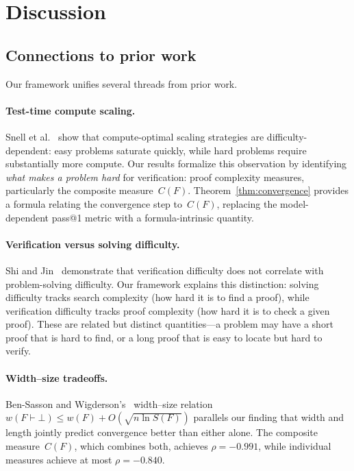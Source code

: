 \section{Discussion}\label{sec:discussion}

\subsection{Connections to prior work}\label{sec:connections}

Our framework unifies several threads from prior work.

\paragraph{Test-time compute scaling.}
Snell et al.~\cite{snell2024scaling} show that compute-optimal scaling
strategies are difficulty-dependent: easy problems saturate quickly, while hard
problems require substantially more compute.  Our results formalize this
observation by identifying \emph{what makes a problem hard} for verification:
proof complexity measures, particularly the composite measure~$C(F)$.
Theorem~\ref{thm:convergence} provides a formula relating the convergence step
to~$C(F)$, replacing the model-dependent pass@1 metric with a formula-intrinsic
quantity.

\paragraph{Verification versus solving difficulty.}
Shi and Jin~\cite{shi2025heimdall} demonstrate that verification difficulty
does not correlate with problem-solving difficulty.  Our framework explains this
distinction: solving difficulty tracks search complexity (how hard it is to find
a proof), while verification difficulty tracks proof complexity (how hard it is
to check a given proof).  These are related but distinct quantities---a problem
may have a short proof that is hard to find, or a long proof that is easy to
locate but hard to verify.

\paragraph{Width--size tradeoffs.}
Ben-Sasson and Wigderson's~\cite{bensasson2001short} width--size relation
$w(F \vdash \bot) \le w(F) + O(\sqrt{n \ln S(F)})$ parallels our finding that
width and length jointly predict convergence better than either alone.  The
composite measure~$C(F)$, which combines both, achieves $\rho = -0.991$, while
individual measures achieve at most $\rho = -0.840$.

